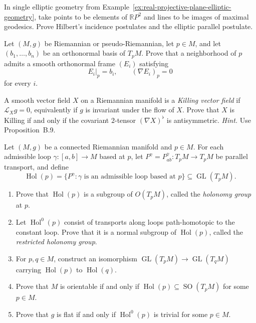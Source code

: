 \begin{exercise}
\label{prob:elliptic-geometry-hilbert}

In single elliptic geometry from
Example~\ref{ex:real-projective-plane-elliptic-geometry}, take points to be
elements of $\mathbb RP^2$ and lines to be images of maximal geodesics. Prove
Hilbert's incidence postulates and the elliptic parallel postulate.
\end{exercise}

\begin{exercise}
\label{prob:orthonormal-frame-zero-covariant-derivative}

Let $(M,g)$ be Riemannian or pseudo-Riemannian, let $p\in M$, and let
$(b_1,\ldots,b_n)$ be an orthonormal basis of $T_pM$. Prove that a neighborhood
of $p$ admits a smooth orthonormal frame $(E_i)$ satisfying
\[
E_i|_p=b_i,
\qquad
(\nabla E_i)_p=0
\]
for every $i$.
\end{exercise}

\begin{exercise}
\label{prob:killing-vector-field}

A smooth vector field $X$ on a Riemannian manifold is a \emph{Killing vector
field} if $\mathcal L_Xg=0$, equivalently if $g$ is invariant under the flow
of $X$. Prove that $X$ is Killing if and only if the covariant $2$-tensor
$(\nabla X)^\flat$ is antisymmetric. \emph{Hint.} Use Proposition~B.9.
\end{exercise}

\begin{exercise}
\label{prob:holonomy-group}

Let $(M,g)$ be a connected Riemannian manifold and $p\in M$. For each
admissible loop $\gamma:[a,b]\to M$ based at $p$, let
$P^\gamma=P^\gamma_{ab}:T_pM\to T_pM$ be parallel transport, and define
\[
\operatorname{Hol}(p)
=\{P^\gamma:\gamma\text{ is an admissible loop based at }p\}
\subseteq\operatorname{GL}(T_pM).
\]
\begin{enumerate}
\item[(a)] Prove that $\operatorname{Hol}(p)$ is a subgroup of $O(T_pM)$,
called the \emph{holonomy group} at $p$.
\item[(b)] Let $\operatorname{Hol}^0(p)$ consist of transports along loops
path-homotopic to the constant loop. Prove that it is a normal subgroup of
$\operatorname{Hol}(p)$, called the \emph{restricted holonomy group}.
\item[(c)] For $p,q\in M$, construct an isomorphism
$\operatorname{GL}(T_pM)\to\operatorname{GL}(T_qM)$ carrying
$\operatorname{Hol}(p)$ to $\operatorname{Hol}(q)$.
\item[(d)] Prove that $M$ is orientable if and only if
$\operatorname{Hol}(p)\subseteq\operatorname{SO}(T_pM)$ for some $p\in M$.
\item[(e)] Prove that $g$ is flat if and only if
$\operatorname{Hol}^0(p)$ is trivial for some $p\in M$.
\end{enumerate}
\end{exercise}
